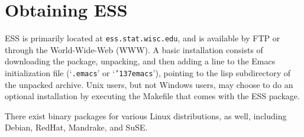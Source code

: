 \documentclass{article}
\newcommand*{\XLispStat}{\textsc{XLispStat}}
\newcommand*{\Stata}{\textsc{Stata}}
\newcommand{\stexttt}[1]{{\small\texttt{#1}}}
\newcommand{\US}{{\char'137}}        %
\newcommand{\file}[1]{`\stexttt{#1}'}
\begin{document}

\singlespace



\appendix
\section{Obtaining ESS}
\label{sec:getIt}

ESS \citep{ESS} is primarily located at \stexttt{ess.stat.wisc.edu}, and is
available by FTP or through the World-Wide-Web (WWW).  A basic
installation consists of downloading the package, unpacking, and then
adding a line to the Emacs initialization file (\file{.emacs} or
\file{\US emacs}), pointing to the lisp subdirectory of the unpacked
archive.  Unix users, but not Windows users, may choose to do an
optional installation by executing the Makefile that comes with the
ESS package.

There exist binary packages for various Linux distributions, as well,
including Debian, RedHat, Mandrake, and SuSE.
\end{document}
